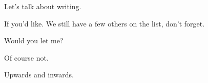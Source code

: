 Let's talk about writing.

\begin{ally}
If you'd like. We still have a few others on the list, don't forget.
\end{ally}
Would you let me?

\begin{ally}
Of course not.
\end{ally}
Upwards and inwards.
\newpage
